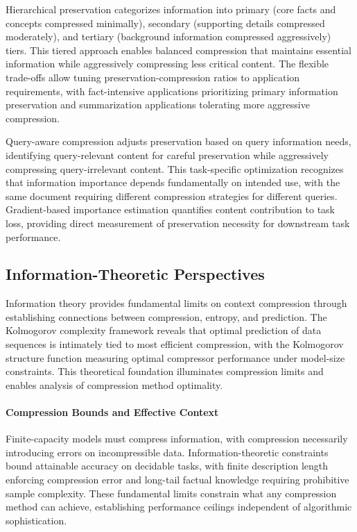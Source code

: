 Hierarchical preservation categorizes information into primary (core facts and concepts compressed minimally), secondary (supporting details compressed moderately), and tertiary (background information compressed aggressively) tiers. This tiered approach enables balanced compression that maintains essential information while aggressively compressing less critical content. The flexible trade-offs allow tuning preservation-compression ratios to application requirements, with fact-intensive applications prioritizing primary information preservation and summarization applications tolerating more aggressive compression.

Query-aware compression adjusts preservation based on query information needs, identifying query-relevant content for careful preservation while aggressively compressing query-irrelevant content. This task-specific optimization recognizes that information importance depends fundamentally on intended use, with the same document requiring different compression strategies for different queries. Gradient-based importance estimation quantifies content contribution to task loss, providing direct measurement of preservation necessity for downstream task performance.

\subsection{Information-Theoretic Perspectives}

Information theory provides fundamental limits on context compression through establishing connections between compression, entropy, and prediction. The Kolmogorov complexity framework reveals that optimal prediction of data sequences is intimately tied to most efficient compression, with the Kolmogorov structure function measuring optimal compressor performance under model-size constraints. This theoretical foundation illuminates compression limits and enables analysis of compression method optimality.

\paragraph{Compression Bounds and Effective Context}

Finite-capacity models must compress information, with compression necessarily introducing errors on incompressible data. Information-theoretic constraints bound attainable accuracy on decidable tasks, with finite description length enforcing compression error and long-tail factual knowledge requiring prohibitive sample complexity. These fundamental limits constrain what any compression method can achieve, establishing performance ceilings independent of algorithmic sophistication.

